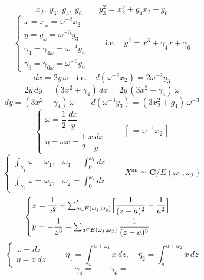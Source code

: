 \documentclass[11pt,a4paper]{article}
\begin{document}
\[
x_2,\ y_3,\ g_4,\ g_6 \qquad \boxed{y_3^2 = x_2^3 + g_4x_2 + g_6}
\]
\[
\begin{cases}
x = x_\omega = \omega^{-2}x_2\\
y = y_\omega = \omega^{-3}y_3\\
\gamma_4 = \gamma_{4\omega} = \omega^{-4}g_4\\
\gamma_6 = \gamma_{6\omega} = \omega^{-6}g_6
\end{cases}
\qquad \text{i.e.}\quad y^2 = x^3 + \gamma_4x + \gamma_6
\]
\[
\boxed{dx = 2y\,\omega}\quad \text{i.e.}\quad
\boxed{d(\omega^{-2}x_2) = 2\omega^{-2}y_3}
\]
\[
2y\,dy = (3x^2+\gamma_4)\,dx = 2y\,(3x^2+\gamma_4)\,\omega
\]
\[
\boxed{dy = (3x^2+\gamma_4)\,\omega}\qquad
\boxed{d(\omega^{-3}y_3) = (3x_2^2+g_4)\,\omega^{-3}}
\]
\[
\begin{cases}
\omega = \dfrac12\,\dfrac{dx}{y}\\[2mm]
\eta = \omega x = \dfrac12\,\dfrac{x\,dx}{y}
\end{cases}
\qquad [\,= \omega^{-1}x_2\,]
\]
\[
\begin{cases}
\int_{\gamma_1}\omega = \omega_1, & \omega_1 = \int_0^{\omega_1}dz\\[1mm]
\int_{\gamma_2}\omega = \omega_2, & \omega_2 = \int_0^{\omega_2}dz
\end{cases}
\qquad X^{\mathrm{an}} \simeq \mathbf{C}/E(\omega_1,\omega_2)
\]
\[
\begin{cases}
x = \dfrac{1}{z^2} + \sum'_{a\in E(\omega_1,\omega_2)}
\Bigl[\dfrac{1}{(z-a)^2} - \dfrac{1}{a^2}\Bigr]\\[3mm]
y = -\dfrac{1}{z^3} - \sum_{a\in E(\omega_1,\omega_2)}\dfrac{1}{(z-a)^3}
\end{cases}
\]
\[
\begin{cases}
\omega = dz\\
\eta = x\,dz
\end{cases}
\qquad \eta_1 = \int_u^{u+\omega_1}x\,dz,\quad
\eta_2 = \int_u^{u+\omega_2}x\,dz
\]
\[
\gamma_4 = \qquad \gamma_6 =
\]
\end{document}
